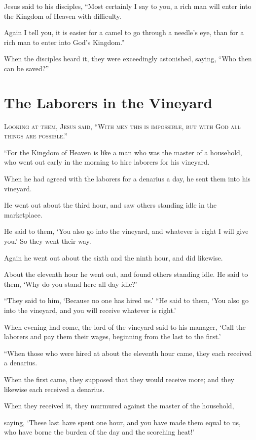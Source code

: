 Jesus said to his disciples, “Most certainly I say to you, a rich man will enter into the Kingdom of Heaven with difficulty.

Again I tell you, it is easier for a camel to go through a needle’s eye, than for a rich man to enter into God’s Kingdom.”

When the disciples heard it, they were exceedingly astonished, saying, “Who then can be saved?”


\clearpage \section*{The Laborers in the Vineyard}

\lettrine{L}{ooking at them, Jesus said, “With men this is impossible, but with God all things are possible.”}

“For the Kingdom of Heaven is like a man who was the master of a household, who went out early in the morning to hire laborers for his vineyard.

When he had agreed with the laborers for a denarius a day, he sent them into his vineyard.

He went out about the third hour, and saw others standing idle in the marketplace.

He said to them, ‘You also go into the vineyard, and whatever is right I will give you.’ So they went their way.

Again he went out about the sixth and the ninth hour, and did likewise.

About the eleventh hour he went out, and found others standing idle. He said to them, ‘Why do you stand here all day idle?’

“They said to him, ‘Because no one has hired us.’ “He said to them, ‘You also go into the vineyard, and you will receive whatever is right.’

When evening had come, the lord of the vineyard said to his manager, ‘Call the laborers and pay them their wages, beginning from the last to the first.’

“When those who were hired at about the eleventh hour came, they each received a denarius.

When the first came, they supposed that they would receive more; and they likewise each received a denarius.

When they received it, they murmured against the master of the household,

saying, ‘These last have spent one hour, and you have made them equal to us, who have borne the burden of the day and the scorching heat!’


